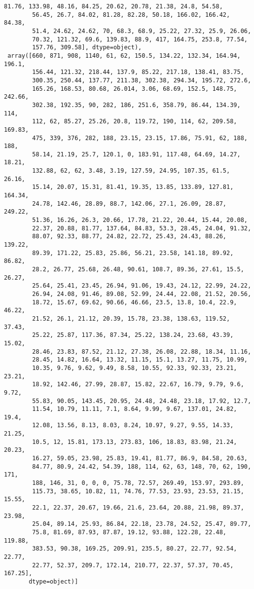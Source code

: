 \documentclass[11pt]{article}
\begin{document}
\begin{tcolorbox}[breakable, size=fbox, boxrule=.5pt, pad at break*=1mm, opacityfill=0]
\begin{Verbatim}[commandchars=\\\{\}]
        81.76, 133.98, 48.16, 84.25, 20.62, 20.78, 21.38, 24.8, 54.58,
        56.45, 26.7, 84.02, 81.28, 82.28, 50.18, 166.02, 166.42, 84.38,
        51.4, 24.62, 24.62, 70, 68.3, 68.9, 25.22, 27.32, 25.9, 26.06,
        70.32, 121.32, 69.6, 139.83, 88.9, 417, 164.75, 253.8, 77.54,
        157.76, 309.58], dtype=object),
 array([660, 871, 908, 1140, 61, 62, 150.5, 134.22, 132.34, 164.94, 196.1,
        156.44, 121.32, 218.44, 137.9, 85.22, 217.18, 138.41, 83.75,
        300.35, 250.44, 137.77, 211.38, 302.38, 294.34, 195.72, 272.6,
        165.26, 168.53, 80.68, 26.014, 3.06, 68.69, 152.5, 148.75, 242.66,
        302.38, 192.35, 90, 282, 186, 251.6, 358.79, 86.44, 134.39, 114,
        112, 62, 85.27, 25.26, 20.8, 119.72, 190, 114, 62, 209.58, 169.83,
        475, 339, 376, 282, 188, 23.15, 23.15, 17.86, 75.91, 62, 188, 188,
        58.14, 21.19, 25.7, 120.1, 0, 183.91, 117.48, 64.69, 14.27, 18.21,
        132.88, 62, 62, 3.48, 3.19, 127.59, 24.95, 107.35, 61.5, 26.16,
        15.14, 20.07, 15.31, 81.41, 19.35, 13.85, 133.89, 127.81, 164.34,
        24.78, 142.46, 28.89, 88.7, 142.06, 27.1, 26.09, 28.87, 249.22,
        51.36, 16.26, 26.3, 20.66, 17.78, 21.22, 20.44, 15.44, 20.08,
        22.37, 20.88, 81.77, 137.64, 84.83, 53.3, 28.45, 24.04, 91.32,
        88.07, 92.33, 88.77, 24.82, 22.72, 25.43, 24.43, 88.26, 139.22,
        89.39, 171.22, 25.83, 25.86, 56.21, 23.58, 141.18, 89.92, 86.82,
        28.2, 26.77, 25.68, 26.48, 90.61, 108.7, 89.36, 27.61, 15.5, 26.27,
        25.64, 25.41, 23.45, 26.94, 91.06, 19.43, 24.12, 22.99, 24.22,
        26.94, 24.08, 91.46, 89.08, 52.99, 24.44, 22.08, 21.52, 20.56,
        18.72, 15.67, 69.62, 90.66, 46.66, 23.5, 13.8, 10.4, 22.9, 46.22,
        21.52, 26.1, 21.12, 20.39, 15.78, 23.38, 138.63, 119.52, 37.43,
        25.22, 25.87, 117.36, 87.34, 25.22, 138.24, 23.68, 43.39, 15.02,
        28.46, 23.83, 87.52, 21.12, 27.38, 26.08, 22.88, 18.34, 11.16,
        28.45, 14.82, 16.64, 13.32, 11.15, 15.1, 13.27, 11.75, 10.99,
        10.35, 9.76, 9.62, 9.49, 8.58, 10.55, 92.33, 92.33, 23.21, 23.21,
        18.92, 142.46, 27.99, 28.87, 15.82, 22.67, 16.79, 9.79, 9.6, 9.72,
        55.83, 90.05, 143.45, 20.95, 24.48, 24.48, 23.18, 17.92, 12.7,
        11.54, 10.79, 11.11, 7.1, 8.64, 9.99, 9.67, 137.01, 24.82, 19.4,
        12.08, 13.56, 8.13, 8.03, 8.24, 10.97, 9.27, 9.55, 14.33, 21.25,
        10.5, 12, 15.81, 173.13, 273.83, 106, 18.83, 83.98, 21.24, 20.23,
        16.27, 59.05, 23.98, 25.83, 19.41, 81.77, 86.9, 84.58, 20.63,
        84.77, 80.9, 24.42, 54.39, 188, 114, 62, 63, 148, 70, 62, 190, 171,
        188, 146, 31, 0, 0, 0, 75.78, 72.57, 269.49, 153.97, 293.89,
        115.73, 38.65, 10.82, 11, 74.76, 77.53, 23.93, 23.53, 21.15, 15.55,
        22.1, 22.37, 20.67, 19.66, 21.6, 23.64, 20.88, 21.98, 89.37, 23.98,
        25.04, 89.14, 25.93, 86.84, 22.18, 23.78, 24.52, 25.47, 89.77,
        75.8, 81.69, 87.93, 87.87, 19.12, 93.88, 122.28, 22.48, 119.88,
        383.53, 90.38, 169.25, 209.91, 235.5, 80.27, 22.77, 92.54, 22.77,
        22.77, 52.37, 209.7, 172.14, 210.77, 22.37, 57.37, 70.45, 167.25],
       dtype=object)]
\end{Verbatim}
\end{tcolorbox}
\end{document}
